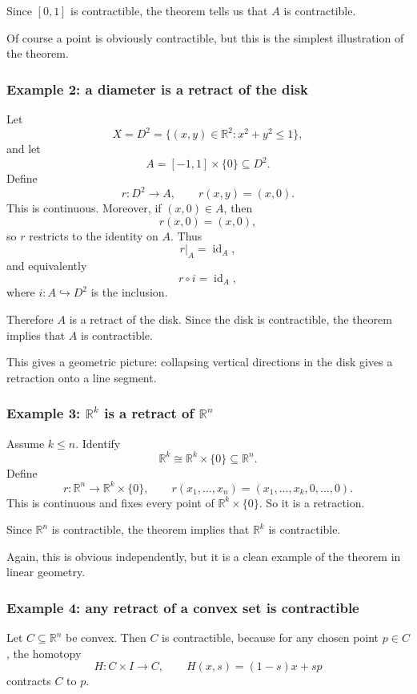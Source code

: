 \documentclass[12pt,a4paper]{article}
\theoremstyle{notespace}
\begin{document}
Since \([0,1]\) is contractible, the theorem tells us that \(A\) is contractible.

Of course a point is obviously contractible, but this is the simplest illustration of the theorem.

\subsubsection{Example 2: a diameter is a retract of the disk}

Let
\[
X=D^2=\{(x,y)\in\mathbb{R}^2:x^2+y^2\le 1\},
\]
and let
\[
A=[-1,1]\times\{0\}\subseteq D^2.
\]
Define
\[
r:D^2\to A,
\qquad
r(x,y)=(x,0).
\]
This is continuous. Moreover, if \((x,0)\in A\), then
\[
r(x,0)=(x,0),
\]
so \(r\) restricts to the identity on \(A\). Thus
\[
r|_A=\operatorname{id}_A,
\]
and equivalently
\[
r\circ i=\operatorname{id}_A,
\]
where \(i:A\hookrightarrow D^2\) is the inclusion.

Therefore \(A\) is a retract of the disk. Since the disk is contractible, the theorem implies that \(A\) is contractible.

This gives a geometric picture: collapsing vertical directions in the disk gives a retraction onto a line segment.

\subsubsection{Example 3: \(\mathbb{R}^k\) is a retract of \(\mathbb{R}^n\)}

Assume \(k\le n\). Identify
\[
\mathbb{R}^k
\cong
\mathbb{R}^k\times\{0\}\subseteq \mathbb{R}^n.
\]
Define
\[
r:\mathbb{R}^n\to \mathbb{R}^k\times\{0\},
\qquad
r(x_1,\dots,x_n)=(x_1,\dots,x_k,0,\dots,0).
\]
This is continuous and fixes every point of \(\mathbb{R}^k\times\{0\}\). So it is a retraction.

Since \(\mathbb{R}^n\) is contractible, the theorem implies that \(\mathbb{R}^k\) is contractible.

Again, this is obvious independently, but it is a clean example of the theorem in linear geometry.

\subsubsection{Example 4: any retract of a convex set is contractible}

Let \(C\subseteq \mathbb{R}^n\) be convex. Then \(C\) is contractible, because for any chosen point \(p\in C\), the homotopy
\[
H:C\times I\to C,
\qquad
H(x,s)=(1-s)x+sp
\]
contracts \(C\) to \(p\).
\end{document}
